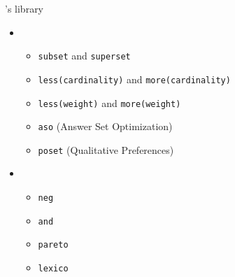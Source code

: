 \begin{frame}{\asprin's library}
  \begin{itemize}
  \item<1-> 
    \begin{itemize}
    \item  \texttt{subset} and \texttt{superset}
    \item  \texttt{less(cardinality)} and \texttt{more(cardinality)}
    \item  \texttt{less(weight)} and \texttt{more(weight)}
    \item  \texttt{aso}   (Answer Set Optimization) \nocite{brnitr03a}
    \item  \texttt{poset} (Qualitative Preferences) \nocite{rogima10a}
    \end{itemize}
  \item<2->  \nocite{sonpon06a}
    \begin{itemize}
    \item \texttt{neg}
    \item \texttt{and}
    \item \texttt{pareto}
    \item \texttt{lexico}
    \end{itemize}
  \end{itemize}
\end{frame}
%
